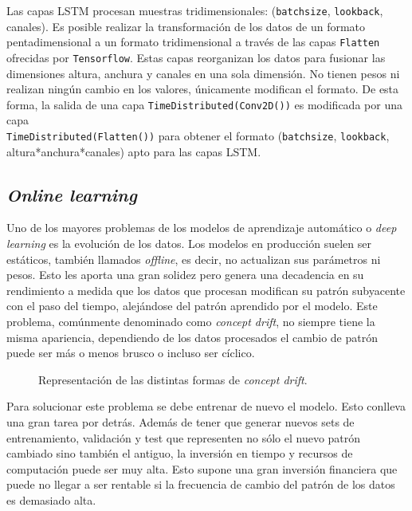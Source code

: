 Las capas LSTM procesan muestras tridimensionales: (\texttt{batchsize}, \texttt{lookback}, canales). Es posible realizar la transformación de los datos de un formato pentadimensional a un formato tridimensional a través de las capas \texttt{Flatten} ofrecidas por \texttt{Tensorflow}. Estas capas reorganizan los datos para fusionar las dimensiones altura, anchura y canales en una sola dimensión. No tienen pesos ni realizan ningún cambio en los valores, únicamente modifican el formato. De esta forma, la salida de una capa \texttt{TimeDistributed(Conv2D())} es modificada por una capa \\ \texttt{TimeDistributed(Flatten())} para obtener el formato (\texttt{batchsize}, \texttt{lookback}, altura*anchura*canales) apto para las capas LSTM.





\subsection{\textit{Online learning}}
Uno de los mayores problemas de los modelos de aprendizaje automático o \textit{deep learning} es la evolución de los datos. Los modelos en producción suelen ser estáticos, también llamados \textit{offline}, es decir, no actualizan sus parámetros ni pesos. Esto les aporta una gran solidez pero genera una decadencia en su rendimiento a medida que los datos que procesan modifican su patrón subyacente con el paso del tiempo, alejándose del patrón aprendido por el modelo. Este problema, comúnmente denominado como \textit{concept drift}, no siempre tiene la misma apariencia, dependiendo de los datos procesados el cambio de patrón puede ser más o menos brusco o incluso ser cíclico.




\begin{figure}[h]
	\centering
	
	\caption{Representación de las distintas formas de \textit{concept drift}. \cite{conceptdrift,conceptdrift1,conceptdrift2}}
\end{figure}
\FloatBarrier

\newpage
Para solucionar este problema se debe entrenar de nuevo el modelo. Esto conlleva una gran tarea por detrás. Además de tener que generar nuevos sets de entrenamiento, validación y test que representen no sólo el nuevo patrón cambiado sino también el antiguo, la inversión en tiempo y recursos de computación puede ser muy alta. Esto supone una gran inversión financiera que puede no llegar a ser rentable si la frecuencia de cambio del patrón de los datos es demasiado alta.

